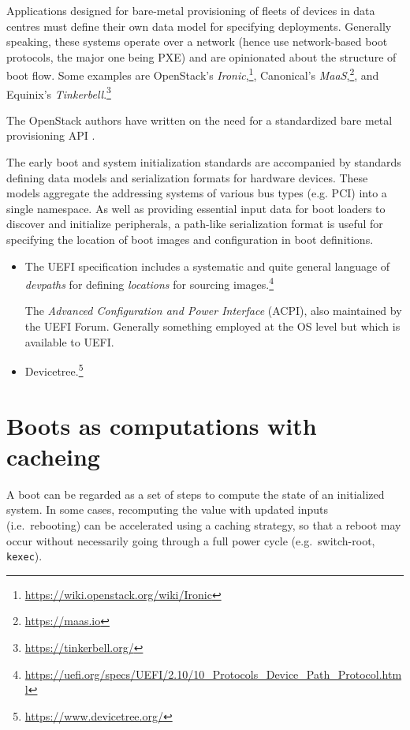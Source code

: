 Applications designed for bare-metal provisioning of fleets of devices in data centres must define their own data model for specifying deployments.
%
Generally speaking, these systems operate over a network (hence use network-based boot protocols, the major one being PXE) and are opinionated about the structure of boot flow.
%
Some examples are OpenStack's \emph{Ironic},\footnote{\url{https://wiki.openstack.org/wiki/Ironic}}, Canonical's \emph{MaaS},\footnote{\url{https://maas.io}}, and Equinix's \emph{Tinkerbell}.\footnote{\url{https://tinkerbell.org/}}

The OpenStack authors have written on the need for a standardized bare metal provisioning API \cite{openstack2023building}.

The early boot and system initialization standards are accompanied by standards defining data models and serialization formats for hardware devices.
%
These models aggregate the addressing systems of various bus types (e.g. PCI) into a single namespace.
%
As well as providing essential input data for boot loaders to discover and initialize peripherals, a path-like serialization format is useful for specifying the location of boot images and configuration in boot definitions.
\begin{itemize}
  \item
    The UEFI specification includes a systematic and quite general language of \emph{devpaths} for defining \emph{locations} for sourcing images.\footnote{\url{https://uefi.org/specs/UEFI/2.10/10\_Protocols\_Device\_Path\_Protocol.html}}

    The \emph{Advanced Configuration and Power Interface} (ACPI), also maintained by the UEFI Forum. Generally something employed at the OS level but which is available to UEFI.
    
  \item
    Devicetree.\footnote{\url{https://www.devicetree.org/}}
\end{itemize}


\section{Boots as computations with cacheing} \label{build}

A boot can be regarded as a set of steps to compute the state of an
initialized system. In some cases, recomputing the value with updated
inputs (i.e.~rebooting) can be accelerated using a caching strategy, so
that a reboot may occur without necessarily going through a full power
cycle (e.g.~switch-root, \texttt{kexec}).

